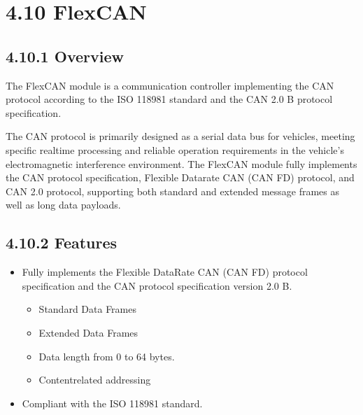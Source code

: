 \documentclass[letterpaper,10pt,openany,english]{sphinxmanual}
\begin{document}
\section{4.10 FlexCAN}
\label{\detokenize{hardware:flexcan}}

\subsection{4.10.1 Overview}
\label{\detokenize{hardware:id14}}
\sphinxAtStartPar
The FlexCAN module is a communication controller implementing the CAN protocol according to the ISO 11898\sphinxhyphen{}1 standard and the CAN 2.0 B protocol specification.

\sphinxAtStartPar
The CAN protocol is primarily designed as a serial data bus for vehicles, meeting specific real\sphinxhyphen{}time processing and reliable operation requirements in the vehicle’s electromagnetic interference environment. The FlexCAN module fully implements the CAN protocol specification, Flexible Data\sphinxhyphen{}rate CAN (CAN FD) protocol, and CAN 2.0 protocol, supporting both standard and extended message frames as well as long data payloads.


\subsection{4.10.2 Features}
\label{\detokenize{hardware:id15}}\begin{itemize}
\item {} 
\sphinxAtStartPar
Fully implements the Flexible Data\sphinxhyphen{}Rate CAN (CAN FD) protocol specification and the CAN protocol specification version 2.0 B.
\begin{itemize}
\item {} 
\sphinxAtStartPar
Standard Data Frames

\item {} 
\sphinxAtStartPar
Extended Data Frames

\item {} 
\sphinxAtStartPar
Data length from 0 to 64 bytes.

\item {} 
\sphinxAtStartPar
Content\sphinxhyphen{}related addressing

\end{itemize}

\item {} 
\sphinxAtStartPar
Compliant with the ISO 11898\sphinxhyphen{}1 standard.

\end{itemize}
\end{document}
